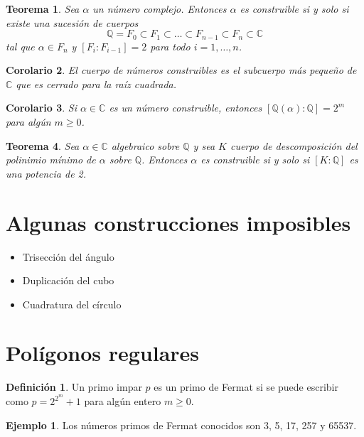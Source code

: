 \documentclass{report}
\newtheorem{theorem}{Teorema}[chapter]
\newtheorem{corollary}[theorem]{Corolario}
\theoremstyle{remark}
\theoremstyle{definition}
\newtheorem{definition}{Definición}[chapter]
\theoremstyle{definition}
\theoremstyle{definition}
\newtheorem*{example}{Ejemplo}
\begin{document}
\begin{theorem}
    Sea $\alpha$ un número complejo. Entonces $\alpha$ es construible si y solo si existe una sucesión de cuerpos
    $$\mathbb{Q} = F_0 \subset F_1 \subset \dots \subset F_{n-1} \subset F_n \subset \mathbb{C}$$
    tal que $\alpha \in F_n$ y $[F_i : F_{i-1}] = 2$ para todo $i = 1, \dots, n$.
\end{theorem}

\begin{corollary}
    El cuerpo de números construibles es el subcuerpo más pequeño de $\mathbb{C}$ que es cerrado para la raíz cuadrada.
\end{corollary}

\begin{corollary}
    Si $\alpha \in \mathbb{C}$ es un número construible, entonces $[\mathbb{Q}(\alpha) : \mathbb{Q}] = 2^m$ para algún $m \geq 0$.
\end{corollary}

\begin{theorem}
    Sea $\alpha \in \mathbb{C}$ algebraico sobre $\mathbb{Q}$ y sea $K$ cuerpo de descomposición del polinimio mínimo de $\alpha$ sobre $\mathbb{Q}$.
    Entonces $\alpha$ es construible si y solo si $[K : \mathbb{Q}]$ es una potencia de 2.
\end{theorem}

\section{Algunas construcciones imposibles}
\begin{itemize}
    \item Trisección del ángulo
    \item Duplicación del cubo
    \item Cuadratura del círculo
\end{itemize}

\section{Polígonos regulares}

\begin{definition}
    Un primo impar $p$ es un primo de Fermat si se puede escribir como $p = 2^{2^m}+1$ para algún entero $m \geq 0$.
\end{definition}

\begin{example}
    Los números primos de Fermat conocidos son 3, 5, 17, 257 y 65537.
\end{example}
\end{document}

